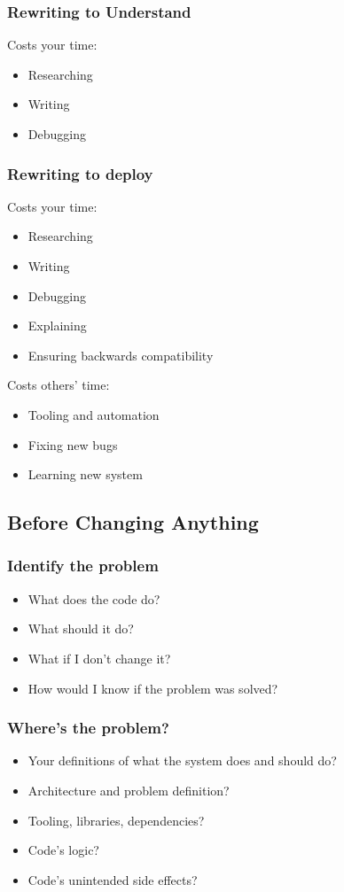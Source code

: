\documentclass{beamer}
\begin{document}
\begin{frame}[fragile]
\frametitle{Rewriting to Understand}
Costs your time:
\begin{itemize}[<+(1)->]
\item Researching
\item Writing
\item Debugging
\end{itemize}
\end{frame}

\begin{frame}[fragile]
\frametitle{Rewriting to deploy}
Costs your time:
\begin{itemize}[<+(1)->]
\item Researching
\item Writing
\item Debugging
\item Explaining
\item Ensuring backwards compatibility
\end{itemize}
Costs others' time:
\begin{itemize}[<+(1)->]
\item Tooling and automation
\item Fixing new bugs
\item Learning new system
\end{itemize}
\end{frame}


\subsection{Before Changing Anything}

\begin{frame}[fragile]
\tableofcontents[currentsubsection]
\end{frame}


\begin{frame}[fragile]
\frametitle{Identify the problem}
\begin{itemize}[<+(1)->]
\item What does the code do?
\item What should it do?
\item What if I don't change it?
\item How would I know if the problem was solved?
\end{itemize}
\end{frame}

\begin{frame}[fragile]
\frametitle{Where's the problem?}
\begin{itemize}[<+(1)->]
\item Your definitions of what the system does and should do?
\item Architecture and problem definition?
\item Tooling, libraries, dependencies?
\item Code's logic?
\item Code's unintended side effects?
\end{itemize}
\end{frame}
\end{document}
